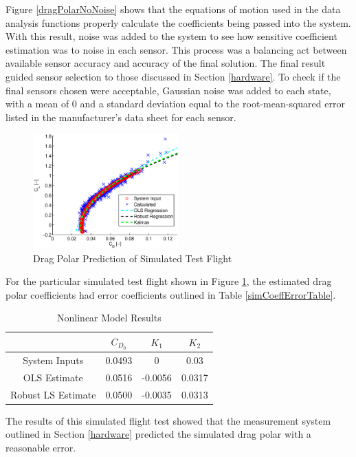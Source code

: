 Figure \ref{dragPolarNoNoise} shows that the equations of motion used in the data analysis functions properly calculate the coefficients being passed into the system. With this result, noise was added to the system to see how sensitive coefficient estimation was to noise in each sensor. This process was a balancing act between available sensor accuracy and accuracy of the final solution. The final result guided sensor selection to those discussed in Section \ref{hardware}. To check if the final sensors chosen were acceptable, Gaussian noise was added to each state, with a mean of $0$ and a standard deviation equal to the root-mean-squared error listed in the manufacturer's data sheet for each sensor.
\begin{figure}[H]
  \caption{Drag Polar Prediction of Simulated Test Flight} \label{dragPolarNoise}
  \centering
    \includegraphics[width=0.5\textwidth]{figures/simDragPolarNoise.eps}
\end{figure}

For the particular simulated test flight shown in Figure \ref{dragPolarNoise}, the estimated drag polar coefficients had error coefficients outlined in Table \ref{simCoeffErrorTable}.

\begin{table}[ht]
\caption{Nonlinear Model Results} %
\centering %
\begin{tabular}{c c c c} %
\hline\hline %
 & $C_{D_0}$ & $K_1$ & $K_2$ \\ [0.5ex] %
\hline %
System Inputs & 0.0493 & 0 & 0.03 \\ %
OLS Estimate & 0.0516 & -0.0056 & 0.0317 \\
Robust LS Estimate & 0.0500 & -0.0035 & 0.0313 \\ [1ex] %
\hline %
\end{tabular}
\label{table:nonlin} %
\end{table}

The results of this simulated flight test showed that the measurement system outlined in Section \ref{hardware} predicted the simulated drag polar with a reasonable error.